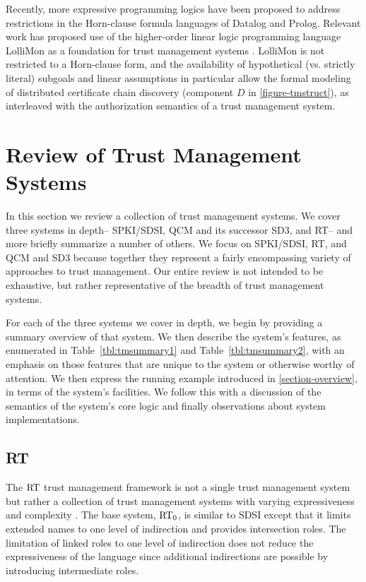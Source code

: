 Recently, more expressive programming logics have been proposed to
address restrictions in the Horn-clause formula languages of Datalog
and Prolog.  Relevant work has proposed use of the higher-order linear
logic programming language LolliMon as a foundation for trust
management systems \cite{polakow-skalka-plas06}.  LolliMon is not
restricted to a Horn-clause form, and the availability of hypothetical
(vs. strictly literal) subgoals and linear assumptions in particular
allow the formal modeling of distributed certificate chain discovery
(component $D$ in \autoref{figure-tmstruct}), as interleaved with the
authorization semantics of a trust management system.

\section{Review of Trust Management Systems}
\label{section-review}

In this section we review a collection of trust management systems.
We cover three systems in depth-- SPKI/SDSI, QCM and its successor
SD3, and RT-- and more briefly summarize a number of others.  We focus
on SPKI/SDSI, RT, and QCM and SD3 because together they represent a fairly
encompassing variety of approaches to trust management.  Our entire
review is not intended to be exhaustive, but rather representative of
the breadth of trust management systems.

For each of the three systems we cover in depth, we begin by providing
a summary overview of that system. We then describe the system's
features, as enumerated in Table~\ref{tbl:tmsummary1} and
Table~\ref{tbl:tmsummary2}, with an emphasis on those features that
are unique to the system or otherwise worthy of attention. We then
express the running example introduced in \autoref{section-overview},
in terms of the system's facilities. We follow this with a discussion
of the semantics of the system's core logic and finally observations
about system implementations.

\subsection{RT}

The $\text{RT}$ trust management framework is not a single trust management
system but rather a collection of trust management systems with varying
expressiveness and complexity \cite{Li:DRBTMF,Li:DCDTM,Li:RRBTMF}. The base
system, $\text{RT}_0$, is similar to SDSI except that it limits extended names to
one level of indirection and provides intersection roles. The limitation of
linked roles to one level of indirection does not reduce the expressiveness
of the language since additional indirections are possible by introducing
intermediate roles.


